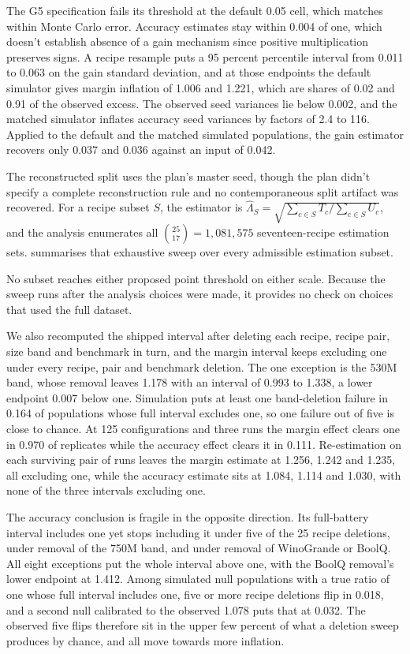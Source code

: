 The G5 specification fails its threshold at the default 0.05 cell, which matches  within Monte Carlo error. Accuracy estimates stay within 0.004 of one, which doesn't establish absence of a gain mechanism since positive multiplication preserves signs. A recipe resample puts a 95 percent percentile interval from 0.011 to 0.063 on the gain standard deviation, and at those endpoints the default simulator gives margin inflation of 1.006 and 1.221, which are shares of 0.02 and 0.91 of the observed excess. The observed seed variances lie below 0.002, and the matched simulator inflates accuracy seed variances by factors of 2.4 to 116. Applied to the default and the matched simulated populations, the gain estimator recovers only 0.037 and 0.036 against an input of 0.042.

The reconstructed split uses the plan's master seed, though the plan didn't specify a complete reconstruction rule and no contemporaneous split artifact was recovered. For a recipe subset $S$, the estimator is $\widehat\Lambda_S=\sqrt{\sum_{c\in S}T_c/\sum_{c\in S}U_c}$, and the analysis enumerates all $\binom{25}{17}=1{,}081{,}575$ seventeen-recipe estimation sets.  summarises that exhaustive sweep over every admissible estimation subset.

No subset reaches either proposed point threshold on either scale. Because the sweep runs after the analysis choices were made, it provides no check on choices that used the full dataset.

We also recomputed the shipped interval after deleting each recipe, recipe pair, size band and benchmark in turn, and the margin interval keeps excluding one under every recipe, pair and benchmark deletion. The one exception is the 530M band, whose removal leaves 1.178 with an interval of 0.993 to 1.338, a lower endpoint 0.007 below one. Simulation puts at least one band-deletion failure in 0.164 of populations whose full interval excludes one, so one failure out of five is close to chance. At 125 configurations and three runs the margin effect clears one in 0.970 of replicates while the accuracy effect clears it in 0.111. Re-estimation on each surviving pair of runs leaves the margin estimate at 1.256, 1.242 and 1.235, all excluding one, while the accuracy estimate sits at 1.084, 1.114 and 1.030, with none of the three intervals excluding one.

The accuracy conclusion is fragile in the opposite direction. Its full-battery interval includes one yet stops including it under five of the 25 recipe deletions, under removal of the 750M band, and under removal of WinoGrande or BoolQ. All eight exceptions put the whole interval above one, with the BoolQ removal's lower endpoint at 1.412. Among simulated null populations with a true ratio of one whose full interval includes one, five or more recipe deletions flip in 0.018, and a second null calibrated to the observed 1.078 puts that at 0.032. The observed five flips therefore sit in the upper few percent of what a deletion sweep produces by chance, and all move towards more inflation.

